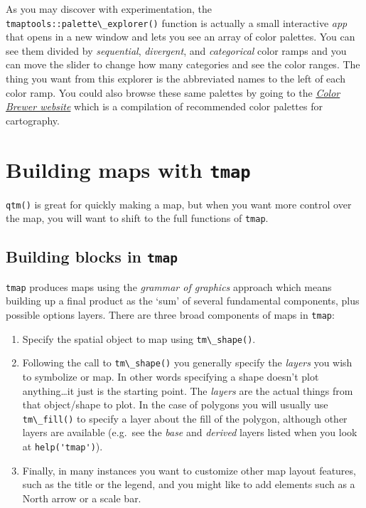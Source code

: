 \documentclass[
]{book}
\newcommand{\passthrough}[1]{#1}
\providecommand{\tightlist}{%
  \setlength{\itemsep}{0pt}\setlength{\parskip}{0pt}}
\begin{document}
As you may discover with experimentation, the \passthrough{\lstinline!tmaptools::palette\_explorer()!} function is actually a small interactive \emph{app} that opens in a new window and lets you see an array of color palettes. You can see them divided by \emph{sequential}, \emph{divergent}, and \emph{categorical} color ramps and you can move the slider to change how many categories and see the color ranges. The thing you want from this explorer is the abbreviated names to the left of each color ramp. You could also browse these same palettes by going to the \href{http://colorbrewer2.org/}{\emph{Color Brewer website}} which is a compilation of recommended color palettes for cartography.

\hypertarget{building-maps-with-tmap}{%
\section{\texorpdfstring{Building maps with \texttt{tmap}}{Building maps with tmap}}\label{building-maps-with-tmap}}

\passthrough{\lstinline!qtm()!} is great for quickly making a map, but when you want more control over the map, you will want to shift to the full functions of \passthrough{\lstinline!tmap!}.

\hypertarget{building-blocks-in-tmap}{%
\subsection{\texorpdfstring{Building blocks in \texttt{tmap}}{Building blocks in tmap}}\label{building-blocks-in-tmap}}

\passthrough{\lstinline!tmap!} produces maps using the \emph{grammar of graphics} approach which means building up a final product as the `sum' of several fundamental components, plus possible options layers. There are three broad components of maps in \passthrough{\lstinline!tmap!}:

\begin{enumerate}
\def\labelenumi{\arabic{enumi}.}
\tightlist
\item
  Specify the spatial object to map using \passthrough{\lstinline!tm\_shape()!}.
\item
  Following the call to \passthrough{\lstinline!tm\_shape()!} you generally specify the \emph{layers} you wish to symbolize or map. In other words specifying a shape doesn't plot anything\ldots it just is the starting point. The \emph{layers} are the actual things from that object/shape to plot. In the case of polygons you will usually use \passthrough{\lstinline!tm\_fill()!} to specify a layer about the fill of the polygon, although other layers are available (e.g.~see the \emph{base} and \emph{derived} layers listed when you look at \passthrough{\lstinline!help('tmap')!}).
\item
  Finally, in many instances you want to customize other map layout features, such as the title or the legend, and you might like to add elements such as a North arrow or a scale bar.
\end{enumerate}
\end{document}
